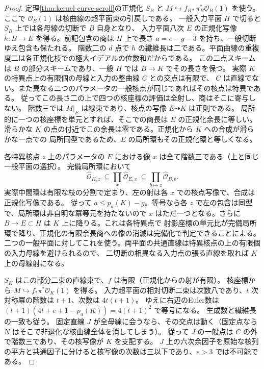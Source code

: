 \begin{proof}
定理\ref{thm:kernel-curve-scroll}の正規化 $S_B$ と $M\hookrightarrow f_{B*}\pi_B^*\mathcal O_B(1)$
を使う。ここで $\mathcal O_B(1)$ は核曲線の超平面束の引戻しである。
一般入力平面 $H$ で切ると $S_B$ 上では各母線の切断で $B$ 自身となり、
入力平面八次 $E$ の正規化写像 $h:B\to E$ を得る。前記包含の商は $H$ 上で長さ
$a=e-g-3$ を持ち、一般切断ゆえ包含も保たれる。
階数二の $d$ 点で $h$ の繊維長は二である。平面曲線の重複度二は各正規化枝での極大イデアルの位数和だからである。
この二点スキームは $B$ の部分スキームであり、一般 $H$ では $B\to K$ でその長さを保つ。
実際 $K$ の特異点上の有限個の母線と入力の整曲線 $C$ との交点は有限で、
$C$ は直線でない。また異なる二つのパラメータの一般核点が同じであればその核点は特異である。
従ってこの長さ二の上で四つの核座標の評価は全射し、商はそこに寄与しない。
階数三では $M|_E$ は線束であり、核点の写像 $E\dashrightarrow K$ は正則である。
局所的に一つの核座標を単元とすれば、そこでの商長は $E$ の正規化余長に等しい。
滑らかな $K$ の点の付近でこの余長は零である。正規化から $K$ への合成が滑らかな一点での
局所同型であるため、$E$ の局所環もその正規化環と等しくなる。

各特異核点 $z$ 上のパラメータの $E$ における像 $x$ は全て階数三である（上と同じ一般平面の選択）。
完備局所環において
\[
 \widehat{\mathcal O}_{K,z}\ \subseteq     \prod_x\widehat{\mathcal O}_{E,x}\ \subseteq        \prod_{b\mapsto z}\widehat{\mathcal O}_{B,b}.
\]
実際中間環は有限な枝の分割で定まり、左の射は各 $x$ での核点写像で、合成は正規化写像である。
従って $a\le p_a(K)-g$。等号なら各 $z$ で左の包含は同型で、局所環は非自明な冪等元を持たないので
$x$ はただ一つとなる。さらに $B\to E\subset H$ は $K$ 上に降りる。これは各特異点で
射影座標の単元比が完備局所環で降り、正規化の有限余長商への像の消滅は完備化で判定できることによる。
二つの一般平面に対してこれを使う。両平面の共通直線は特異核点の上の有限個の入力母線を避けられるので、
二切断の相異なる入力点の張る直線を取れば $K$ 上の母線射になる。

$S_K$ はこの部分二束の直線束で、$f$ は有限（正規化からの射が有限）。
核座標から $M\hookrightarrow f_*\pi^*\mathcal O_K(1)$ を得る。
入力超平面の相対切断二束は次数八であり、$t$ 次対称冪の階数は $t+1$、次数は $4t(t+1)$。
ゆえに右辺のEuler数は $(t+1)(4t+e+1-p_a(K))=4(t+1)^2$ で等号になる。
生成数と繊維長の一致も従う。
固定直線 $J$ が全母線に会うなら、その交点は動く（固定点なら $N$ はそこで非退化な核曲線全体を消してしまう）。
従って $J$ の一般点は $C$ の外で階数三であり、その核写像が $K$ を支配する。
$J$ 上の六次余因子を原始な核列の平方と共通因子に分けると核写像の次数は三以下であり、$e>3$ では不可能である。
\end{proof}

